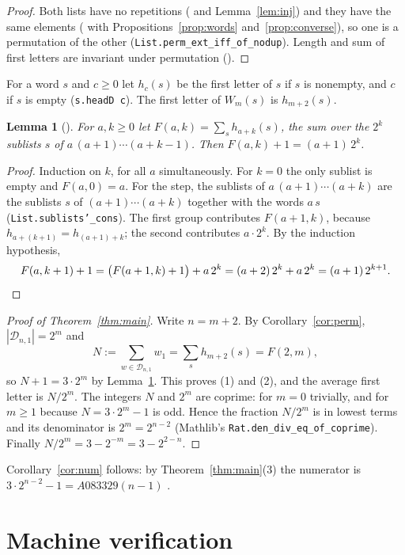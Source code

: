 \documentclass[11pt]{amsart}
\theoremstyle{plain}
\newtheorem{lemma}[theorem]{Lemma}
\theoremstyle{definition}
\newcommand{\cD}{\mathcal{D}}
\begin{document}
\begin{proof}
Both lists have no repetitions ( and Lemma~\ref{lem:inj}) and they have the same elements ( with Propositions~\ref{prop:words} and~\ref{prop:converse}), so one is a permutation of the other (\texttt{List.perm\_ext\_iff\_of\_nodup}). Length and sum of first letters are invariant under permutation ().
\end{proof}

For a word $s$ and $c\ge0$ let $h_c(s)$ be the first letter of $s$ if $s$ is nonempty, and $c$ if $s$ is empty (\texttt{s.headD c}). The first letter of $W_m(s)$ is $h_{m+2}(s)$.

\begin{lemma}[]\label{lem:sum}
For $a,k\ge0$ let $F(a,k)=\sum_s h_{a+k}(s)$, the sum over the $2^k$ sublists $s$ of $a\,(a+1)\cdots(a+k-1)$. Then $F(a,k)+1=(a+1)\,2^k$.
\end{lemma}

\begin{proof}
Induction on $k$, for all $a$ simultaneously. For $k=0$ the only sublist is empty and $F(a,0)=a$. For the step, the sublists of $a\,(a+1)\cdots(a+k)$ are the sublists $s$ of $(a+1)\cdots(a+k)$ together with the words $a\,s$ (\texttt{List.sublists'\_cons}). The first group contributes $F(a+1,k)$, because $h_{a+(k+1)}=h_{(a+1)+k}$; the second contributes $a\cdot2^k$. By the induction hypothesis,
\[
  F(a,k+1)+1=\bigl(F(a+1,k)+1\bigr)+a\,2^k=(a+2)\,2^k+a\,2^k=(a+1)\,2^{k+1}. \qedhere
\]
\end{proof}

\begin{proof}[Proof of Theorem~\ref{thm:main}]
Write $n=m+2$. By Corollary~\ref{cor:perm}, $|\cD_{n,1}|=2^m$ and
\[
  N:=\sum_{w\in\cD_{n,1}}w_1=\sum_s h_{m+2}(s)=F(2,m),
\]
so $N+1=3\cdot2^m$ by Lemma~\ref{lem:sum}. This proves (1) and (2), and the average first letter is $N/2^m$. The integers $N$ and $2^m$ are coprime: for $m=0$ trivially, and for $m\ge1$ because $N=3\cdot2^m-1$ is odd. Hence the fraction $N/2^m$ is in lowest terms and its denominator is $2^m=2^{n-2}$ (Mathlib's \texttt{Rat.den\_div\_eq\_of\_coprime}). Finally $N/2^m=3-2^{-m}=3-2^{2-n}$.
\end{proof}

Corollary~\ref{cor:num} follows: by Theorem~\ref{thm:main}(3) the numerator is $3\cdot2^{n-2}-1=A083329(n-1)$ \cite{A083329}.

\section{Machine verification}\label{sec:lean}
\end{document}
